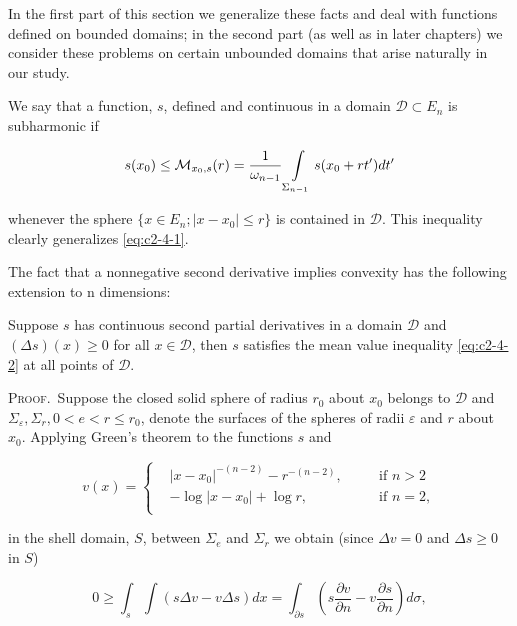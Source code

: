 In the first part of this section we generalize these facts and deal with functions defined on bounded domains; in the second part (as well as in later chapters) we consider these problems on certain unbounded domains that arise naturally in our study.

We say that a function, $s$, defined and continuous in a domain $\mathcal{D} \subset E_n$ is subharmonic if

\begin{equation}\label{eq:c2-4-2}
s(x_{0})\leq\mathcal{M}_{x_{0},s}(r)=\frac{1}{\omega_{n-1}}\intop_{\Sigma_{n-1}}s(x_{0}+r t^{\prime})d t^{\prime}
\end{equation}

whenever the sphere $\{x \in E_n; |x - x_0| \leq r\}$ is contained in $\mathcal{D}$. This inequality clearly generalizes \eqref{eq:c2-4-1}.

The fact that a nonnegative second derivative implies convexity has the following extension to n dimensions:

\begin{theorem}
\label{thm:c2-4-3}
Suppose $s$ has continuous second partial derivatives in a domain $\mathcal{D}$ and $(\Delta s)(x) \geq 0$ for all $x \in \mathcal{D}$, then $s$ satisfies the mean value inequality \eqref{eq:c2-4-2} at all points of $\mathcal{D}$.
\end{theorem}

\textsc{Proof.}\ Suppose the closed solid sphere of radius $r_0$ about $x_0$ belongs to $\mathcal{D}$ and $\Sigma_\varepsilon, \Sigma_r, 0 < e < r \leq r_0$, denote the surfaces of the spheres of radii $\varepsilon$ and $r$ about $x_0$. Applying Green's theorem to the functions $s$ and

\[
v(x)=\left\{\begin{aligned}{}&{{}\left|x-x_{0}\right|^{-(n-2)}-r^{-(n-2)},\quad}&{}&{{}\text{if }n>2}\\ {}&{{}\left.-\log|x-x_{0}|\right.+\log r,\quad}&{}&{{}\text{if }n=2,}\\ \end{aligned}\right.
\]

in the shell domain, $S$, between $\Sigma_e$ and $\Sigma_r$ we obtain (since $\Delta v = 0$ and $\Delta s \geq 0$ in $S$)

\[
0\geq\int_{s}\int\left(s\Delta v-v\Delta s\right)d x=\int_{\partial s}\left(s\frac{\partial v}{\partial n}-v\frac{\partial s}{\partial n}\right)d\sigma,
\]

